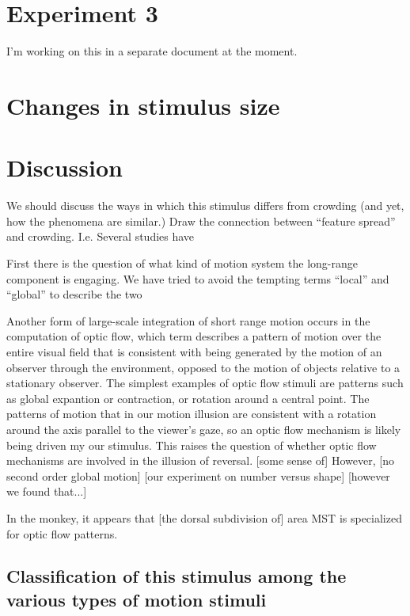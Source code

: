 \documentclass[english,jou]{article}
\begin{document}
\section{Experiment 3\label{sec:number}}

I'm working on this in a separate document at the moment.


\section{Changes in stimulus size}




\section{Discussion}

We should discuss the ways in which this stimulus differs from crowding
(and yet, how the phenomena are similar.) Draw the connection between
``feature spread'' and crowding. I.e. Several studies have 

First there is the question of what kind of motion system the long-range
component is engaging. We have tried to avoid the tempting terms ``local''
and ``global'' to describe the two 

\begin{singlespace}
Another form of large-scale integration of short range motion occurs
in the computation of optic flow, which term  describes a pattern
of motion over the entire visual field that is consistent with being
generated by the motion of an observer through the environment, opposed
to the motion of objects relative to a stationary observer. The simplest
examples of optic flow stimuli are patterns such as global expantion
or contraction, or rotation around a central point. The patterns of
motion that in our motion illusion are consistent with a rotation
around the axis parallel to the viewer's gaze, so an optic flow mechanism
is likely being driven my our stimulus. This raises the question of
whether optic flow mechanisms are involved in the illusion of reversal.
{[}some sense of{]} However, {[}no second order global motion{]} {[}our
experiment on number versus shape{]} {[}however we found that...{]}

In the monkey, it appears that {[}the dorsal subdivision of{]} area
MST is specialized for optic flow patterns. 
\end{singlespace}


\subsection{Classification of this stimulus among the various types of motion
stimuli}
\end{document}
